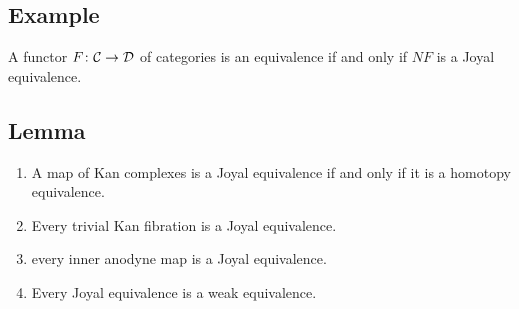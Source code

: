     \subsection{Example}\label{chVI-2-11}
        A functor $F \colon \mathcal{C} \to \mathcal{D}$ of categories is an equivalence if and only if $N F$ is a Joyal equivalence.

    \subsection{Lemma}\label{chVI-2-12}
        \begin{enumerate}[label=\roman*)]
            \item 
                A map of Kan complexes is a Joyal equivalence if and only if it  is a homotopy equivalence.\label{chVI-2-12-1}
            \item 
                Every trivial Kan fibration is a Joyal equivalence.\label{chVI-2-12-2}
            \item 
                every inner anodyne map is a Joyal equivalence.\label{chVI-2-12-3}
            \item 
                Every Joyal equivalence is a weak equivalence.\label{chVI-2-12-4}
        \end{enumerate}
        \smallskip

